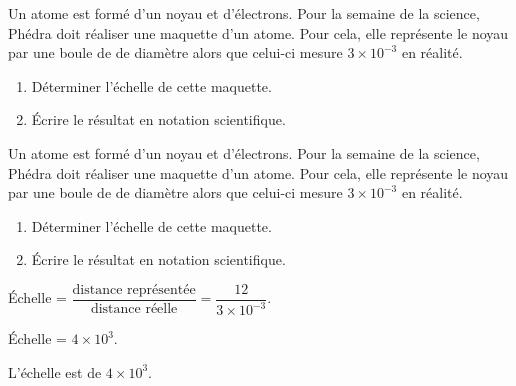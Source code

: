 \begin{exercice*}
    Un atome est formé d’un noyau et d’électrons. Pour la semaine de la science, Phédra doit réaliser
    une maquette d’un atome. Pour cela, elle représente le noyau par une boule de  de diamètre alors
    que celui-ci mesure $3 \times 10^{-3}$ \Lg{} en réalité.    
    \begin{enumerate}
        \item Déterminer l’échelle de cette maquette.
        \item Écrire le résultat en notation scientifique.
    \end{enumerate}    
\end{exercice*}
\begin{corrige}
    Un atome est formé d’un noyau et d’électrons. Pour la semaine de la science, Phédra doit réaliser
    une maquette d’un atome. Pour cela, elle représente le noyau par une boule de  de diamètre alors
    que celui-ci mesure $3 \times 10^{-3}$ \Lg{} en réalité.
    
    \begin{enumerate}
        \item Déterminer l’échelle de cette maquette.
        \item Écrire le résultat en notation scientifique.
    \end{enumerate}    

    {\red
    Échelle = $\dfrac{\text{distance représentée}}{\text{distance réelle}}=\dfrac{12}{3\times 10^{-3}}$.
    
    Échelle = $4\times 10^3$.

    L'échelle est de $4\times 10^3$.
    }
\end{corrige}

